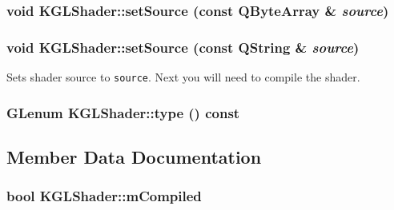 \hypertarget{class_k_g_l_shader_a76416255c6cb080de7a92a553129bb9}{
\subsubsection[{setSource}]{\setlength{\rightskip}{0pt plus 5cm}void KGLShader::setSource (const QByteArray \& {\em source})}}
\label{class_k_g_l_shader_a76416255c6cb080de7a92a553129bb9}


\hypertarget{class_k_g_l_shader_053304f7caa6280d1485f4c89ef2d76f}{
\subsubsection[{setSource}]{\setlength{\rightskip}{0pt plus 5cm}void KGLShader::setSource (const QString \& {\em source})}}
\label{class_k_g_l_shader_053304f7caa6280d1485f4c89ef2d76f}


Sets shader source to {\tt source}. Next you will need to compile the shader. \hypertarget{class_k_g_l_shader_c059d873e4ed8c305373818da8caf9f2}{
\subsubsection[{type}]{\setlength{\rightskip}{0pt plus 5cm}GLenum KGLShader::type () const}}
\label{class_k_g_l_shader_c059d873e4ed8c305373818da8caf9f2}




\subsection{Member Data Documentation}
\hypertarget{class_k_g_l_shader_393f2afe8e1d5bb528e3b0dfebdeec94}{
\subsubsection[{mCompiled}]{\setlength{\rightskip}{0pt plus 5cm}bool {\bf KGLShader::mCompiled}}}
\label{class_k_g_l_shader_393f2afe8e1d5bb528e3b0dfebdeec94}


